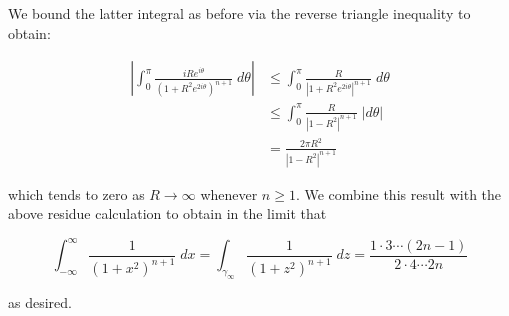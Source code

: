 \begin{solution}
  \pagebreak
  We bound the latter integral as before via the reverse triangle inequality to obtain:

  \begin{align*}
    \left|\int_0^{\pi} { \frac{i R e^{i \theta}}{\left(1 + R^2 e^{2 i \theta}\right)^{n+1}} \; d\theta } \right|
      &\le \int_0^{\pi} { \frac{R}{\left| 1 + R^2 e^{2 i \theta} \right|^{n+1}} \; d\theta} \\
      &\le \int_0^{\pi} { \frac{R}{\left| 1 - R^2 \right|^{n+1}} \; |d\theta|} \\
      &= \frac{2 \pi R^2}{\left| 1 - R^2 \right|^{n+1}}
  \end{align*}

  which tends to zero as $R \to \infty$ whenever $n \ge 1$. We combine this result with the above residue calculation to 
  obtain in the limit that 

  $$
    \int_{-\infty}^{\infty} { \frac{1}{(1 + x^2)^{n+1}} \; dx } 
      = \int_{\gamma_{\infty}} { \frac{1}{(1 + z^2)^{n+1}} \; dz } 
      = \frac{1 \cdot 3 \cdots (2n - 1)}{2 \cdot 4 \cdots 2n}
  $$ 

  as desired.

  \ \\
\end{solution}